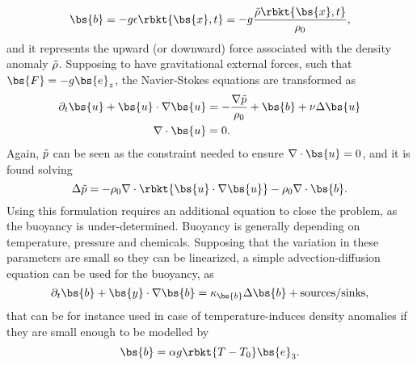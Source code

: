 \begin{equation*}
    \bs{b} = -g\epsilon\rbkt{\bs{x},t} = -g\dfrac{\Tilde{\rho}\rbkt{\bs{x},t}}{\rho_{0}},
\end{equation*}
and it represents the upward (or downward) force associated with the density anomaly $\Tilde{\rho}$. Supposing to have gravitational external forces, such that $\bs{F}=-g\bs{e}_{z}$, the Navier-Stokes equations are transformed as
\begin{align}
    \partial_{t}\bs{u} + \bs{u}\cdot\nabla\bs{u} &= -\dfrac{\nabla \Tilde{p}}{\rho_{0}} + \bs{b} + \nu\Delta\bs{u}\\
    \nabla\cdot\bs{u} &= 0.
\end{align}
Again, $\Tilde{p}$ can be seen as the constraint needed to ensure $\nabla\cdot\bs{u}=0$, and it is found solving 
\begin{equation}
    \Delta\Tilde{p}=-\rho_{0}\nabla\cdot\rbkt{\bs{u}\cdot\nabla\bs{u}}-\rho_{0}\nabla\cdot\bs{b}.
\end{equation}
Using this formulation requires an additional equation to close the problem, as the buoyancy is under-determined. Buoyancy is generally depending on temperature, pressure and chemicals. Supposing that the variation in these parameters are small so they can be linearized, a simple advection-diffusion equation can be used for the buoyancy, as
\begin{equation}
    \partial_{t}\bs{b} + \bs{y}\cdot\nabla\bs{b} = \kappa_{\bs{b}}\Delta\bs{b} + \text{sources/sinks},
\end{equation}
that can be for instance used in case of temperature-induces density anomalies if they are small enough to be modelled by
\begin{equation*}
    \bs{b} = \alpha g\rbkt{T - T_{0}}\bs{e}_{3}.
\end{equation*}

